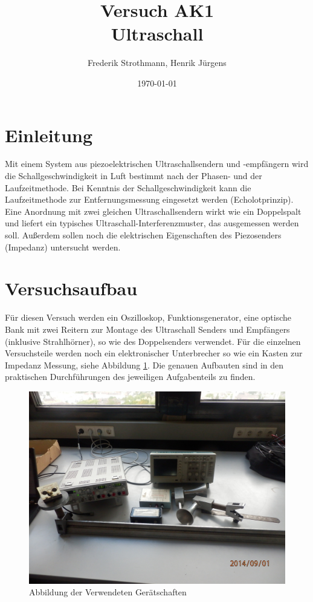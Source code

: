 \documentclass[12pt]{scrartcl}
\title{Versuch AK1\\ Ultraschall}
\author{Frederik Strothmann, Henrik Jürgens}
\date{\today}
\begin{document}

\maketitle
\newpage
\tableofcontents
\newpage


\section{Einleitung}
Mit einem System aus piezoelektrischen Ultraschallsendern und -empfängern wird die Schallgeschwindigkeit in Luft
bestimmt nach der Phasen- und der Laufzeitmethode. Bei Kenntnis der Schallgeschwindigkeit kann die Laufzeitmethode zur Entfernungsmessung eingesetzt werden (Echolotprinzip). Eine Anordnung mit zwei gleichen Ultraschallsendern wirkt wie ein Doppelspalt und liefert ein typisches
Ultraschall-Interferenzmuster, das ausgemessen werden soll.
Außerdem sollen noch die elektrischen Eigenschaften des Piezosenders (Impedanz) untersucht werden.


\section{Versuchsaufbau}
Für diesen Versuch werden ein Oszilloskop, Funktionsgenerator, eine optische Bank mit zwei Reitern zur Montage des Ultraschall Senders und Empfängers (inklusive Strahlhörner), so wie des Doppelsenders verwendet. Für die einzelnen Versuchsteile werden noch ein elektronischer Unterbrecher so wie ein Kasten zur Impedanz Messung, siehe Abbildung \ref{fig:impedanz}. Die genauen Aufbauten sind in den praktischen Durchführungen des jeweiligen Aufgabenteils zu finden.

\begin{figure}[htbp] 
  \centering
    \includegraphics[scale = 0.1]{versuchsaufbau.JPG}
  	\caption[Abbildung der Verwendeten Gerätschaften]{Abbildung der Verwendeten Gerätschaften}
  \label{fig:impedanz}
\end{figure}
\end{document}
